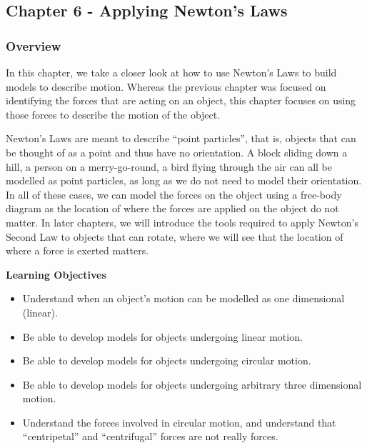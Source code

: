 \subsection{Chapter 6 - Applying Newton's Laws}

\subsubsection{Overview}\label{chap:ApplyingNewtonsLaws}

In this chapter, we take a closer look at how to use Newton's Laws to build models to describe motion. Whereas the previous chapter was focused on identifying the forces that are acting on an object, this chapter focuses on using those forces to describe the motion of the object.

Newton's Laws are meant to describe ``point particles'', that is, objects that can be thought of as a point and thus have no orientation. A block sliding down a hill, a person on a merry-go-round, a bird flying through the air can all be modelled as point particles, as long as we do not need to model their orientation. In all of these cases, we can model the forces on the object using a free-body diagram as the location of where the forces are applied on the object do not matter. In later chapters, we will introduce the tools required to apply Newton's Second Law to objects that can rotate, where we will see that the location of where a force is exerted matters.

\begin{framed}
\textbf{Learning Objectives}\\
\begin{itemize}
\item Understand when an object's motion can be modelled as one dimensional (linear).
\item Be able to develop models for objects undergoing linear motion.
\item Be able to develop models for objects undergoing circular motion.
\item Be able to develop models for objects undergoing arbitrary three dimensional motion.
\item Understand the forces involved in circular motion, and understand that ``centripetal'' and ``centrifugal'' forces are not really forces.
\end{itemize}
\end{framed}

